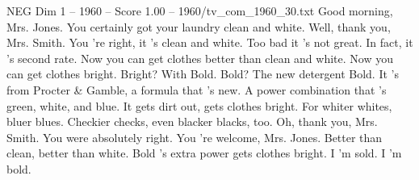 \begin{textsample}{NEG Dim 1 – 1960 – Score 1.00 – 1960/tv\_com\_1960\_30.txt}  \label{ex:f1_neg_077}
Good morning, Mrs.
Jones.
You certainly got your laundry clean and white.
Well, thank you, Mrs.
Smith.
You 're right, it 's clean and white.
Too bad it 's not great.
In fact, it 's second rate.
Now you can get clothes better than clean and white.
Now you can get clothes bright.
Bright?
With Bold.
Bold?
The new detergent Bold.
It 's from Procter \& Gamble, a formula that 's new.
A power combination that 's green, white, and blue.
It gets dirt out, gets clothes bright.
For whiter whites, bluer blues.
Checkier checks, even blacker blacks, too.
Oh, thank you, Mrs.
Smith.
You were absolutely right.
You 're welcome, Mrs.
Jones.
Better than clean, better than white.
Bold 's extra power gets clothes bright.
I 'm sold.
I 'm bold.

\end{textsample}
